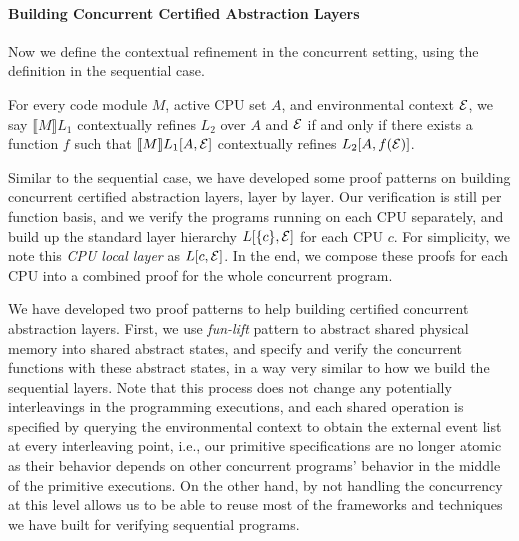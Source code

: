 
\paragraph{Building Concurrent Certified Abstraction Layers}
Now we define the contextual refinement in the concurrent setting,
using the definition in the sequential case.

\begin{definition}
For every code module $M$, active CPU set $A$, and environmental context
$\mathcal{E}$, we say $\llbracket{}M\rrbracket{}L_1$ contextually refines
$L_2$ over $A$ and $\mathcal{E}$ if and only if there exists a function
$f$ such that $\llbracket{}M\rrbracket{}L_1[A,\mathcal{E}]$ contextually
refines $L_2[A,f(\mathcal{E})]$. 
\end{definition}

Similar to the sequential case, we have developed some proof patterns on
building concurrent certified abstraction layers, layer by layer.
Our verification is still per function basis, and we verify the programs
running on each CPU separately, and build up the standard layer hierarchy
$L[\{c\},\mathcal{E}]$ for each CPU $c$. For simplicity, we note this
\emph{CPU local layer} as $L[c,\mathcal{E}]$.
In the end, we compose these proofs for each CPU
into a combined proof for the whole concurrent program.

We have developed two proof patterns to help building certified concurrent
abstraction layers. First, we use \emph{fun-lift} pattern to abstract shared
physical memory into shared abstract states, and specify and verify the
concurrent functions with these abstract states, in a way very similar to
how we build the sequential layers. Note that this process does not change
any potentially interleavings in the programming executions, and each shared
operation is specified by querying the environmental context to obtain the
external event list at every interleaving point, i.e., our primitive specifications
are no longer atomic as their behavior depends on other concurrent programs' behavior
in the middle of the primitive executions. On the other hand, by not handling
the concurrency at this level allows us to be able to reuse most of the
frameworks and techniques we have built for verifying sequential programs.

